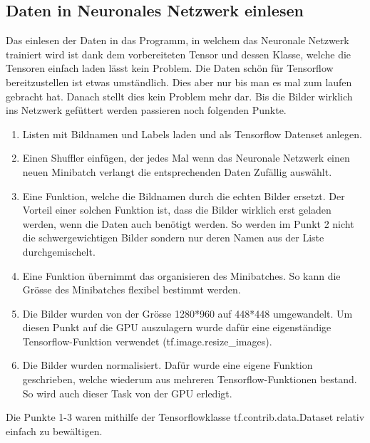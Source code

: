 \subsection{Daten in Neuronales Netzwerk einlesen}
Das einlesen der Daten in das Programm, in welchem das Neuronale Netzwerk trainiert wird ist dank dem vorbereiteten Tensor und dessen Klasse, welche die Tensoren einfach laden lässt kein Problem. 
Die Daten schön für Tensorflow bereitzustellen ist etwas umständlich.
Dies aber nur bis man es mal zum laufen gebracht hat. 
Danach stellt dies kein Problem mehr dar. 
Bis die Bilder wirklich ins Netzwerk gefüttert werden passieren noch folgenden Punkte. 
\begin{enumerate}
\item Listen mit Bildnamen und Labels laden und als Tensorflow Datenset anlegen.
\item Einen \grqq{}Shuffler\grqq{} einfügen, der jedes Mal wenn das Neuronale Netzwerk einen neuen Minibatch verlangt die entsprechenden Daten Zufällig auswählt.
\item Eine Funktion, welche die Bildnamen durch die echten Bilder ersetzt. 
Der Vorteil einer solchen Funktion ist, dass die Bilder wirklich erst geladen werden, wenn die Daten auch benötigt werden. 
So werden im Punkt 2 nicht die schwergewichtigen Bilder sondern nur deren Namen aus der Liste durchgemischelt. 
\item Eine Funktion übernimmt das organisieren des Minibatches. 
So kann die Grösse des Minibatches flexibel bestimmt werden.
\item Die Bilder wurden von der Grösse 1280*960 auf 448*448 umgewandelt. 
Um diesen Punkt auf die GPU auszulagern wurde dafür eine eigenständige Tensorflow-Funktion verwendet (tf.image.resize\_images). 
\item Die Bilder wurden normalisiert. 
Dafür wurde eine eigene Funktion geschrieben, welche wiederum aus mehreren Tensorflow-Funktionen bestand. 
So wird auch dieser Task von der GPU erledigt.
\end{enumerate}
Die Punkte 1-3 waren mithilfe der Tensorflowklasse \grqq{}tf.contrib.data.Dataset\grqq{} relativ einfach zu bewältigen.
